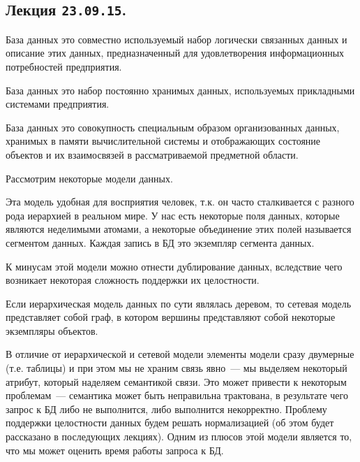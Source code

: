 \subsection{%
  Лекция \texttt{23.09.15}.%
}

\begin{definition}
  База данных это совместно используемый набор логически связанных данных и
  описание этих данных, предназначенный для удовлетворения информационных
  потребностей предприятия.
\end{definition}

\begin{definition}[по Дейту]
  База данных это набор постоянно хранимых данных, используемых прикладными
  системами предприятия.
\end{definition}

\begin{definition}[по Хомоненко]
  База данных это совокупность специальным образом организованных данных,
  хранимых в памяти вычислительной системы и отображающих состояние объектов и
  их взаимосвязей в рассматриваемой предметной области.
\end{definition}

Рассмотрим некоторые модели данных.


Эта модель удобная для восприятия человек, т.к. он часто сталкивается с
разного рода иерархией в реальном мире. У нас есть некоторые поля данных,
которые являются неделимыми атомами, а некоторые объединение этих полей
называется сегментом данных. Каждая запись в БД это экземпляр сегмента данных.

К минусам этой модели можно отнести дублирование данных, вследствие чего
возникает некоторая сложность поддержки их целостности.


Если иерархическая модель данных по сути являлась деревом, то сетевая модель
представляет собой граф, в котором вершины представляют собой некоторые
экземпляры объектов.


В отличие от иерархической и сетевой модели элементы модели сразу двумерные
(т.е. таблицы) и при этом мы не храним связь явно~--- мы выделяем некоторый
атрибут, который наделяем семантикой связи. Это может привести к некоторым
проблемам~--- семантика может быть неправильна трактована, в результате чего
запрос к БД либо не выполнится, либо выполнится некорректно. Проблему поддержки
целостности данных будем решать нормализацией (об этом будет рассказано в
последующих лекциях). Одним из плюсов этой модели является то, что мы может
оценить время работы запроса к БД.

